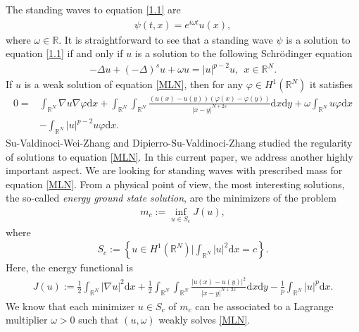 \documentclass[12pt,a4paper,reqno]{amsart}
\numberwithin{equation}{section}
\begin{document}
The standing waves to equation \eqref{1.1} are
\begin{equation*}
\begin{aligned}
\psi(t,x)=e^{i\omega t}u(x),
\end{aligned}
\end{equation*}
where $\omega \in \mathbb{R}$. It is straightforward to see that a standing wave $\psi$ is a solution to equation \eqref{1.1} if and only if $u$ is a solution to the following  Schr\"{o}dinger equation 
\begin{equation}\label{MLN}
\begin{aligned}
-\Delta u
+(-\Delta)^{s}u+\omega u=|u|^{p-2}u, \ \ x\in \mathbb{R}^{N}.
\end{aligned}
\tag{MLN}
\end{equation}
If $u$ is a weak solution of equation \eqref{MLN},
then for any $\varphi\in H^{1}(\mathbb{R}^{N})$ it satisfies
\begin{equation*}
\begin{aligned}
0=&
\int_{\mathbb{R}^{N}}
\nabla u
\nabla \varphi
\mathrm{d}x
+
\int_{\mathbb{R}^{N}}
\int_{\mathbb{R}^{N}}
\frac{(u(x)-u(y))(\varphi(x)-\varphi(y))}{|x-y|^{N+2s}}
\mathrm{d}x
\mathrm{d}y
+\omega
\int_{\mathbb{R}^{N}}
u\varphi
\mathrm{d}x\\
&-
\int_{\mathbb{R}^{N}}
|u|^{p-2}
u\varphi
\mathrm{d}x.
\end{aligned}
\end{equation*}
Su-Valdinoci-Wei-Zhang
\cite{Su-Valdinoci-Wei-Zhang2022MZ,Su-Valdinoci-Wei-Zhang2025JDE}
and Dipierro-Su-Valdinoci-Zhang
\cite{Dipierro-Su-Valdinoci-Zhang2025DCDS} studied the regularity of solutions to equation \eqref{MLN}.
In this current paper,
we address another highly important aspect.
We are looking for standing waves with prescribed mass for equation \eqref{MLN}.
From a physical point of view,
the most interesting solutions,
the so-called {\it energy ground state solution},
are the minimizers of the problem
\begin{equation*}
\begin{aligned}
m_{c}:=\inf_{u\in S_{c}}J(u),
\end{aligned}
\end{equation*}
where
\begin{equation*}
\begin{aligned}
S_{c}:=\left\{u\in H^{1}(\mathbb{R}^{N})\bigg| \int_{\mathbb{R}^{N}}
|u|^{2}
\mathrm{d}x
=c\right\}.
\end{aligned}
\end{equation*}
Here, the energy functional is
\begin{equation*}
\begin{aligned}
J(u):=\frac{1}{2}\int_{\mathbb{R}^{N}}
|\nabla u|^{2}
\mathrm{d}x
+\frac{1}{2}
\int_{\mathbb{R}^{N}}
\int_{\mathbb{R}^{N}}
\frac{|u(x)-u(y)|^{2}}{|x-y|^{N+2s}}
\mathrm{d}x
\mathrm{d}y
-
\frac{1}{p}
\int_{\mathbb{R}^{N}}
|u|^{p}
\mathrm{d}x.
\end{aligned}
\end{equation*}
We know that each minimizer $u\in S_{c}$ of $m_{c}$ can be associated to a Lagrange multiplier $\omega>0$ such that
$(u,\omega)$ weakly solves \eqref{MLN}.
\end{document}
